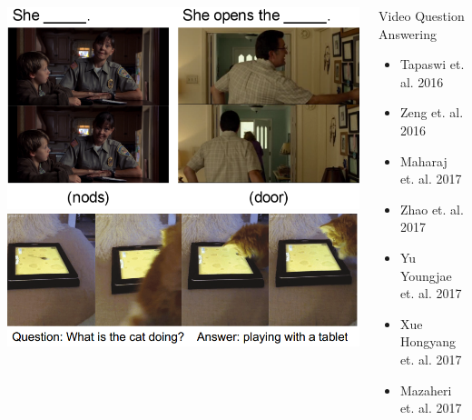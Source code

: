 \begin{frame}
	\begin{columns}
		\begin{column}{0.6\textwidth}
			\vspace{0.2in}
			\begin{overlayarea}{\textwidth}{\textheight}
				\includegraphics[scale=0.25]{images/module8/fill-in-blank.png}\\
				\includegraphics[scale=0.3]{images/module8/open-end-video-QA.png}\\
			\end{overlayarea}
		\end{column}

		\begin{column}{0.4\textwidth}
			\begin{overlayarea}{\textwidth}{\textheight}

				\begin{block}{Video Question Answering
					}
					\begin{itemize}
						\item Tapaswi et. al. 2016 \cite{DBLP:conf/cvpr/TapaswiZSTUF16}
						\item Zeng et. al. 2016 \cite{DBLP:journals/corr/ZengCCLNS16}
						\item Maharaj et. al. 2017 \cite{DBLP:conf/cvpr/MaharajBRCP17}
						\item Zhao et. al. 2017 \cite{DBLP:conf/ijcai/ZhaoYCHZ17}
						\item Yu Youngjae et. al. 2017 \cite{DBLP:conf/cvpr/YuKCK17}
						\item Xue Hongyang et. al. 2017 \cite{DBLP:journals/corr/XueZC17}
						\item Mazaheri et. al. 2017 \cite{DBLP:journals/corr/MazaheriZS16}
					\end{itemize}
				\end{block}
			\end{overlayarea}
		\end{column}


\end{columns}
\end{frame}
